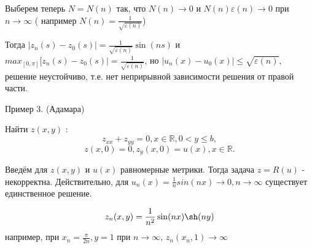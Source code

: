 \documentclass{article}
\begin{document}
Выберем теперь $N = N(n)$ так, что $N(n) \rightarrow 0$ и $N(n)\varepsilon(n) \rightarrow 0$ при $n \rightarrow \infty $ ( например $N(n) = \frac{1}{\sqrt{\varepsilon (n)}}$)

Тогда $|z_n(s) - z_0(s)| = \frac{1}{\sqrt{\varepsilon (n)}} \sin(ns)$ и $max_{[0,\pi]}[z_n(s) - z_0(s)| = \frac{1}{\sqrt{\varepsilon (n)}}$, но $|u_n(x) - u_0(x)| \leqslant \sqrt{\varepsilon (n)}$, решение неустойчиво, т.е. нет неприрывной зависимости решения от правой части.

Пример 3. (Адамара)

Найти $z(x,y)$ : 
$$
z_{xx} + z_{yy} = 0, x \in \mathbb{R}, 0 < y \leqslant b,
$$$$
z(x,0)=0, z_y(x,0) = u(x), x \in \mathbb{R}.
$$

Введём для $z(x,y)$ и $u(x)$ равномерные метрики. Тогда задача $z = R(u)$ - некорректна. Действительно, для $ u_n(x) = \frac{1}{n} sin(nx) \rightarrow 0, n \rightarrow \infty $ существует единственное решение.

$$
z_n(x,y) = \frac{1}{n^2} \sin(nx) \sh(ny)
$$ 
например, при $x_n = \frac{\pi}{2n}, y =1$ при $n \rightarrow \infty $, $z_n(x_n, 1) \rightarrow \infty $
\end{document}
